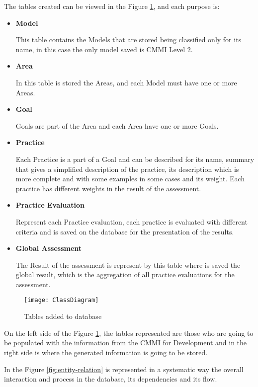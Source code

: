 The tables created can be viewed in the Figure \ref{fig:database}, and each purpose is:
\begin{itemize}
	\item \textbf{Model}
	
	This table contains the Models that are stored being classified only for its name, in this case the only model saved is CMMI Level 2.
	\item \textbf{Area}
	
	In this table is stored the Areas, and each Model must have one or more Areas.
	\item \textbf{Goal}
	
	Goals are part of the Area and each Area have one or more Goals.
	\item \textbf{Practice}
	
	Each Practice is a part of a Goal and can be described for its name, summary that gives a simplified description of the practice, its description which is more complete and with some examples in some cases and its weight. Each practice has different weights in the result of the assessment.
	
	\item \textbf{Practice Evaluation}
	
	Represent each Practice evaluation, each practice is evaluated with different criteria and is saved on the database for the presentation of the results.
	
	\item \textbf{Global Assessment}
	
	The Result of the assessment is represent by this table where is saved the global result, which is the aggregation of all practice evaluations for the assessment.
	
\end{itemize}

\begin{figure}[h]
	\begin{center}
		\leavevmode
		\texttt{[image: ClassDiagram]}
		\caption{Tables added to database}
		\label{fig:database}
	\end{center}
\end{figure}


On the left side of the Figure \ref{fig:database}, the tables represented are those who are going to be populated with the information from the CMMI for Development and in the right side is where the generated information is going to be stored.

In the Figure \ref{fig:entity-relation} is represented in a systematic way the overall interaction and process in the database, its dependencies and its flow.



